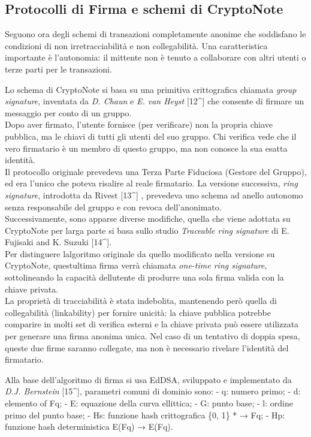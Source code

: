 \subsection{Protocolli di Firma e schemi di
CryptoNote}\label{protocolli-di-firma-e-schemi-di-cryptonote}

Seguono ora degli schemi di transazioni completamente anonime che
soddisfano le condizioni di non irretracciabilità e non collegabilità.
Una caratteristica importante è l'autonomia: il mittente non è tenuto a
collaborare con altri utenti o terze parti per le transazioni.

Lo schema di CryptoNote si basa su una primitiva crittografica chiamata
\emph{group signature}, inventata da \emph{D. Chaun} e \emph{E. van
Heyst} {[}12\^{}{]} che consente di firmare un messaggio per conto di un
gruppo.\\
Dopo aver firmato, l'utente fornisce (per verificare) non la propria
chiave pubblica, ma le chiavi di tutti gli utenti del suo gruppo. Chi
verifica vede che il vero firmatario è un membro di questo gruppo, ma
non conosce la sua esatta identità.\\
Il protocollo originale prevedeva una Terza Parte Fiduciosa (Gestore del
Gruppo), ed era l'unico che poteva risalire al reale firmatario. La
versione successiva, \emph{ring} \emph{signature}, introdotta da Rivest
{[}13\^{}{]} , prevedeva uno schema ad anello autonomo senza
responsabile del gruppo e con revoca dell'anonimato.\\
Successivamente, sono apparse diverse modifiche, quella che viene
adottata su CryptoNote per larga parte si basa sullo studio
\emph{Traceable ring signature} di E. Fujisaki and K. Suzuki
{[}14\^{}{]}.\\
Per distinguere l\textquotesingle algoritmo originale da quello
modificato nella versione su CryptoNote, quest\textquotesingle ultima
firma verrà chiamata \emph{one-time ring signature}, sottolineando la
capacità dell\textquotesingle utente di produrre una sola firma valida
con la chiave privata.\\
La proprietà di tracciabilità è stata indebolita, mantenendo però quella
di collegabilità (linkability) per fornire unicità: la chiave pubblica
potrebbe comparire in molti set di verifica esterni e la chiave privata
può essere utilizzata per generare una firma anonima unica. Nel caso di
un tentativo di doppia spesa, queste due firme saranno collegate, ma non
è necessario rivelare l'identità del firmatario.

Alla base dell'algoritmo di firma si usa EdDSA, sviluppato e
implementato da \emph{D.J. Bernstein} {[}15\^{}{]}, parametri comuni di
dominio sono: - q: numero primo; - d: elemento of Fq; - E: equazione
della curva ellittica; - G: punto base; - l: ordine primo del punto
base; - Hs: funzione hash crittografica \{0, 1\} * → Fq; - Hp: funzione
hash deterministica E(Fq) → E(Fq).

